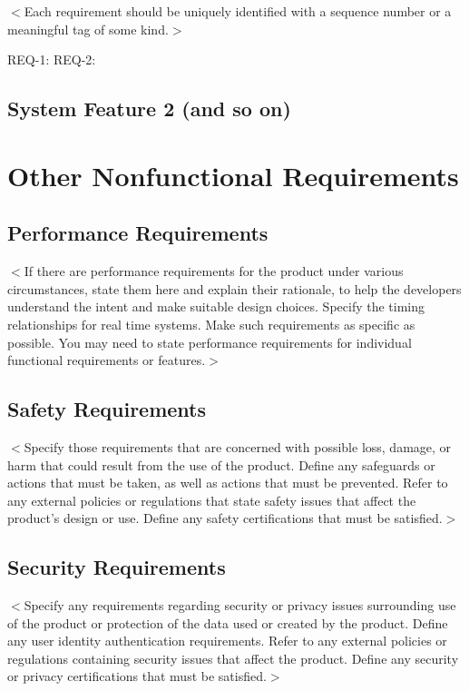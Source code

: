 \documentclass{scrreprt}
\begin{document}
\begin{CJK}{UTF8}{bkai}
$<$Each requirement should be uniquely identified with a sequence number or a 
meaningful tag of some kind.$>$

REQ-1:	REQ-2:

\section{System Feature 2 (and so on)}


\chapter{Other Nonfunctional Requirements}

\section{Performance Requirements}
$<$If there are performance requirements for the product under various 
circumstances, state them here and explain their rationale, to help the 
developers understand the intent and make suitable design choices. Specify the 
timing relationships for real time systems. Make such requirements as specific 
as possible. You may need to state performance requirements for individual 
functional requirements or features.$>$

\section{Safety Requirements}
$<$Specify those requirements that are concerned with possible loss, damage, or 
harm that could result from the use of the product. Define any safeguards or 
actions that must be taken, as well as actions that must be prevented. Refer to 
any external policies or regulations that state safety issues that affect the 
product’s design or use. Define any safety certifications that must be 
satisfied.$>$

\section{Security Requirements}
$<$Specify any requirements regarding security or privacy issues surrounding use 
of the product or protection of the data used or created by the product. Define 
any user identity authentication requirements. Refer to any external policies or 
regulations containing security issues that affect the product. Define any 
security or privacy certifications that must be satisfied.$>$


\end{CJK}
\end{document}
